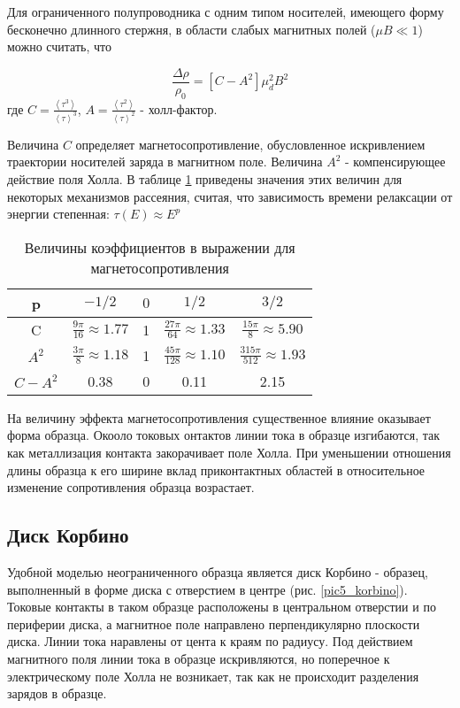 Для ограниченного полупроводника с одним типом носителей, имеющего форму бесконечно длинного стержня, в области слабых магнитных полей ($\mu B \ll 1$) можно считать, что

\begin{equation}
\frac{\Delta \rho}{\rho_{0}} = [C - A^2] \mu^{2}_{d} B^2
\end{equation}
где $C = \frac{\left< \tau^3 \right>}{\left< \tau \right>^3}$, $A = \frac{\left< \tau^2 \right>}{\left< \tau \right>^2}$ - холл-фактор.

Величина $C$ определяет магнетосопротивление, обусловленное искривлением траектории носителей заряда в магнитном поле. Величина $A^2$ - компенсирующее действие поля Холла. В таблице \ref{table5_koef} приведены значения этих величин для некоторых механизмов рассеяния, считая, что зависимость времени релаксации от энергии степенная: $\tau(E) \approx E^p$

\begin{table}[h!]
\caption{Величины коэффициентов в выражении для магнетосопротивления}
\begin{center}
\begin{tabular}{c|c|c|c|c}
p & $-1/2$ & $0$ & $1/2$ & $3/2$ \\
\hline
C & $\frac{9 \pi}{16} \approx 1.77$ & 1 & $\frac{27 \pi}{64} \approx 1.33$ & $\frac{15 \pi}{8} \approx 5.90$ \\
$A^2$ & $\frac{3 \pi}{8} \approx 1.18$ & 1 & $\frac{45 \pi}{128} \approx 1.10$ & $\frac{315 \pi}{512} \approx 1.93$ \\
$C-A^2$ & 0.38 & 0 & 0.11 & 2.15 \\
\hline
\end{tabular}
\end{center}
\label{table5_koef}
\end{table}

На величину эффекта магнетосопротивления существенное влияние оказывает форма образца. Окооло токовых онтактов линии тока в образце изгибаются, так как металлизация контакта закорачивает поле Холла. При уменьшении отношения длины образца к его ширине вклад приконтактных областей в относительное изменение сопротивления образца возрастает.

\subsection{Диск Корбино}
Удобной моделью неограниченного образца является диск Корбино - образец, выполненный в форме диска с отверстием в центре (рис. \ref{pic5_korbino}). Токовые контакты в таком образце расположены в центральном отверстии и по периферии диска, а магнитное поле направлено перпендикулярно плоскости диска. Линии тока наравлены от цента к краям по радиусу. Под действием магнитного поля линии тока в образце искривляются, но поперечное к электрическому поле Холла не возникает, так как не происходит разделения зарядов в образце.

